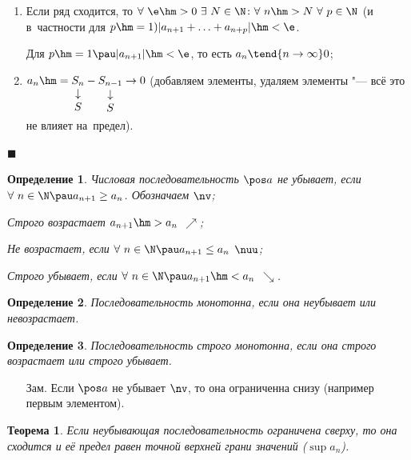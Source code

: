 \documentclass[a4paper,10pt,twoside]{article}
\newtheorem{Def}{Определение}[section]
\newtheorem{The}{Теорема}[section]
\newenvironment{Proof}
       {\par\noindent{\textbf{Доказательство.}}}
       {\hfill$\scriptstyle\blacksquare$}
\begin{document}
\begin{Proof}
\begin{enumerate}
\item Если ряд сходится, то $\forall\  \e\hm>0\ \exists\  N\in\N\colon
\forall\  n\hm>N\ \forall\  p\in\N$ (и в~частности для $p\hm=1) |a_{n+1}+\ldots+a_{n+p}|\hm<\e$.

Для $p\hm=1\pau |a_{n+1}|\hm<\e$, то есть $a_n\tend{n\to\infty}0$;

\item $a_n\hm=
\underset{\displaystyle
    \begin{matrix}
    \downarrow\\S
    \end{matrix}}{S_n}-
\underset{\displaystyle
    \begin{matrix}
    \downarrow\\S
    \end{matrix}}{S_{n-1}}\to 0$ (добавляем элементы, удаляем элементы "--- всё это не влияет на~предел).
\end{enumerate}
\end{Proof}

\begin{Def}
Числовая последовательность $\pos a$ не убывает, если $\forall\  n\in\N\pau a_{n+1}\geq a_n$. Обозначаем $\nv$;

Строго возрастает $a_{n+1}\hm>a_n$ $\nearrow$;

Не возрастает, если $\forall\  n\in\N\pau a_{n+1}\leq a_n$ $\nuu$;

Строго убывает, если $\forall\  n\in\N\pau a_{n+1}\hm<a_n$ $\searrow$.
\end{Def}

\begin{Def}
Последовательность монотонна, если она неубывает или невозрастает.
\end{Def}

\begin{Def}
Последовательность строго монотонна, если она строго возрастает или строго убывает.
\end{Def}
\begin{itemize}
\item[Зам.] Если $\pos a$ не убывает $\nv$, то она ограниченна снизу (например первым элементом).
\end{itemize}
\begin{The}\label{The18}
Если неубывающая последовательность ограничена сверху, то она сходится и её предел равен точной верхней грани значений ($\sup a_n$).
\end{The}
\end{document}
